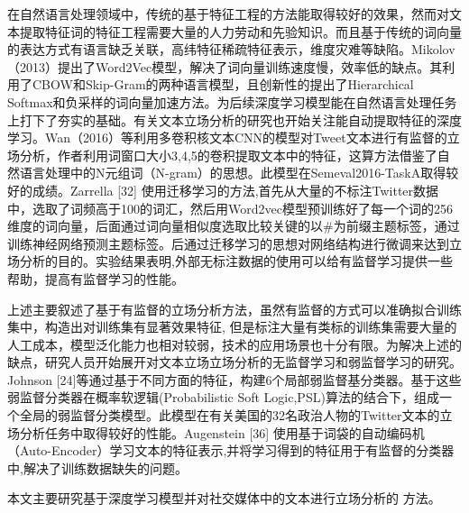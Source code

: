 在自然语言处理领域中，传统的基于特征工程的方法能取得较好的效果，然而对文本提取特征词的特征工程需要大量的人力劳动和先验知识。而且基于传统的词向量的表达方式有语言缺乏关联，高纬特征稀疏特征表示，维度灾难等缺陷。Mikolov（2013）提出了Word2Vec模型，解决了词向量训练速度慢，效率低的缺点。其利用了CBOW和Skip-Gram的两种语言模型，且创新性的提出了Hierarchical Softmax和负采样的词向量加速方法。为后续深度学习模型能在自然语言处理任务上打下了夯实的基础。有关文本立场分析的研究也开始关注能自动提取特征的深度学习。Wan（2016）等利用多卷积核文本CNN的模型对Tweet文本进行有监督的立场分析，作者利用词窗口大小3,4,5的卷积提取文本中的特征，这算方法借鉴了自然语言处理中的N元组词（N-gram）的思想。此模型在Semeval2016-TaskA取得较好的成绩。Zarrella [32] 使用迁移学习的方法,首先从大量的不标注Twitter数据中，选取了词频高于100的词汇，然后用Word2vec模型预训练好了每一个词的256维度的词向量，后面通过词向量相似度选取比较关键的以\#为前缀主题标签，通过训练神经网络预测主题标签。后通过迁移学习的思想对网络结构进行微调来达到立场分析的目的。实验结果表明,外部无标注数据的使用可以给有监督学习提供一些帮助，提高有监督学习的性能。

上述主要叙述了基于有监督的立场分析方法，虽然有监督的方式可以准确拟合训练集中，构造出对训练集有显著效果特征, 但是标注大量有类标的训练集需要大量的人工成本，模型泛化能力也相对较弱，技术的应用场景也十分有限。为解决上述的缺点，研究人员开始展开对文本立场立场分析的无监督学习和弱监督学习的研究。 Johnson [24]等通过基于不同方面的特征，构建6个局部弱监督基分类器。基于这些弱监督分类器在概率软逻辑(Probabilistic Soft Logic,PSL)算法的结合下，组成一个全局的弱监督分类模型。此模型在有关美国的32名政治人物的Twitter文本的立场分析任务中取得较好的性能。Augenstein [36] 使用基于词袋的自动编码机（Auto-Encoder）学习文本的特征表示,并将学习得到的特征用于有监督的分类器中,解决了训练数据缺失的问题。




本文主要研究基于深度学习模型并对社交媒体中的文本进行立场分析的
方法。
